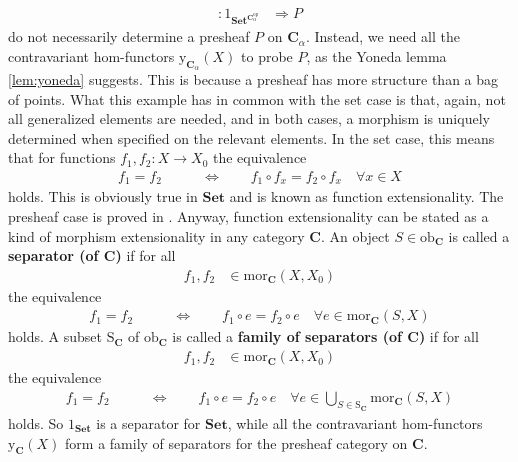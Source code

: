 \begin{exa}
\begin{enumerate}
\begin{align*}
  \colon
  1_{\mathbf{Set}^{\mathbf{C}_{\alpha}^{\mathrm{op}}}}
  &\Rightarrow
  P
\end{align*}
do not necessarily determine a presheaf $P$ on $\mathbf{C}_{\alpha}$.
Instead, we need all the contravariant hom-functors $\mathrm{y}_{\mathbf{C}_{\alpha}}(X)$ to probe $P$, as the Yoneda lemma \ref{lem:yoneda} suggests.
This is because a presheaf has more structure than a bag of points.
What this example has in common with the set case is that, again, not all generalized elements are needed, and in both cases, a morphism is uniquely determined when specified on the relevant elements.
In the set case, this means that for functions $f_{1},f_{2} \colon X \rightarrow X_{0}$ the equivalence
\begin{align*}
  f_{1}
  =
  f_{2}
  \qquad
  &\Leftrightarrow
  \qquad
  f_{1}
  \circ
  f_{x}
  =
  f_{2}
  \circ
  f_{x}
  \quad
  \forall
  x
  \in
  X
\end{align*}
holds.
This is obviously true in $\mathbf{Set}$ and is known as function extensionality.
The presheaf case is proved in \cite{c55c71e8}.
Anyway, function extensionality can be stated as a kind of morphism extensionality in any category $\mathbf{C}$.
An object $S \in \mathrm{ob}_{\mathbf{C}}$ is called a \textbf{separator (of $\mathbf{C}$)} if for all
\begin{align*}
  f_{1},
  f_{2}
  &\in
  \mathrm{mor}_{\mathbf{C}}(X,X_{0})
\end{align*}
the equivalence
\begin{align*}
  f_{1}
  =
  f_{2}
  \qquad
  &\Leftrightarrow
  \qquad
  f_{1}
  \circ
  e
  =
  f_{2}
  \circ
  e
  \quad
  \forall
  e
  \in
  \mathrm{mor}_{\mathbf{C}}(S,X)
\end{align*}
holds.
A subset $\mathrm{S}_{\mathbf{C}}$ of $\mathrm{ob}_{\mathbf{C}}$ is called a \textbf{family of separators (of $\mathbf{C}$)} if for all
\begin{align*}
  f_{1},
  f_{2}
  &\in
  \mathrm{mor}_{\mathbf{C}}(X,X_{0})
\end{align*}
the equivalence
\begin{align*}
  f_{1}
  =
  f_{2}
  \qquad
  &\Leftrightarrow
  \qquad
  f_{1}
  \circ
  e
  =
  f_{2}
  \circ
  e
  \quad
  \forall
  e
  \in
  \bigcup_{S \in \mathrm{S}_{\mathbf{C}}}
  \mathrm{mor}_{\mathbf{C}}(S,X)
\end{align*}
holds.
So $1_{\mathbf{Set}}$ is a separator for $\mathbf{Set}$, while all the contravariant hom-functors $\mathrm{y}_{\mathbf{C}}(X)$ form a family of separators for the presheaf category on $\mathbf{C}$.

\end{enumerate}
\end{exa}
